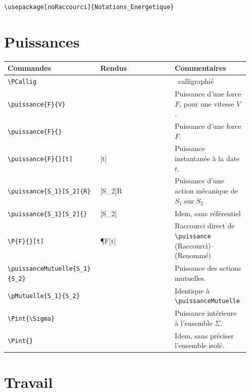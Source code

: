 \documentclass[a4paper,10pt]{article}
\newcommand{\rac}{({\color{red}Raccourci})}
\newcommand{\ren}{({\color{blue}Renommé})}
\begin{document}
	\begin{verbatim}
\usepackage[noRaccourci]{Notations_Energetique}
	\end{verbatim}

	\section{Puissances}
	\noindent
	
	\begin{tabular}{|p{0.35\linewidth}|p{0.3\linewidth}|p{0.3\linewidth}|}
		\hline
			\textbf{Commandes}&\textbf{Rendus}&\textbf{Commentaires}
		\\\hline\hline
			\verb!\PCallig!			&	\PCallig			&	\PCallig\ calligraphié
		\\\hline
			\verb!\puissance{F}{V}!		&	\puissance{F}{V}		&	Puissance d'une force $F$, pour une vitesse $V$.
		\\\hline
			\verb!\puissance{F}{}!		&	\puissance{F}{}			&	Puissance d'une force $F$.
		\\\hline
			\verb!\puissance{F}{}[t]!	&	\puissance{F}{}[t]		&	Puissance instantanée à la date $t$.
		\\\hline
			\verb!\puissance{S_1}[S_2]{R}!		&	\puissance{S_1}[S_2]{R}			&	Puissance d'une action mécanique de $S_1$ sur $S_2$
		\\\hline
			\verb!\puissance{S_1}[S_2]{}!		&	\puissance{S_1}[S_2]{}			&	Idem, sans référentiel
		\\\hline
			\verb!\P{F}{}[t]!		&	\P{F}{}[t]			&	Raccourci direct de \verb!\puissance! \rac -- \ren
		\\\hline
			\verb!\puissanceMutuelle{S_1}! \verb!{S_2}!		&	\puissanceMutuelle{S_1}{S_2}			&	Puissance des actions mutuelles.
		\\\hline
			\verb!\pMutuelle{S_1}{S_2}!		&	\pMutuelle{S_1}{S_2}			&	Identique à \verb!\puissanceMutuelle!
		\\\hline
			\verb!\Pint{\Sigma}!		&	\Pint{\Sigma}			&	Puissance intérieure à l'ensemble $\Sigma$.
		\\\hline
			\verb!\Pint{}!		&	\Pint{}			&	Idem, sans préciser l'ensemble isolé.
		\\\hline
	\end{tabular}


	\section{Travail}
	\noindent
	
\end{document}
